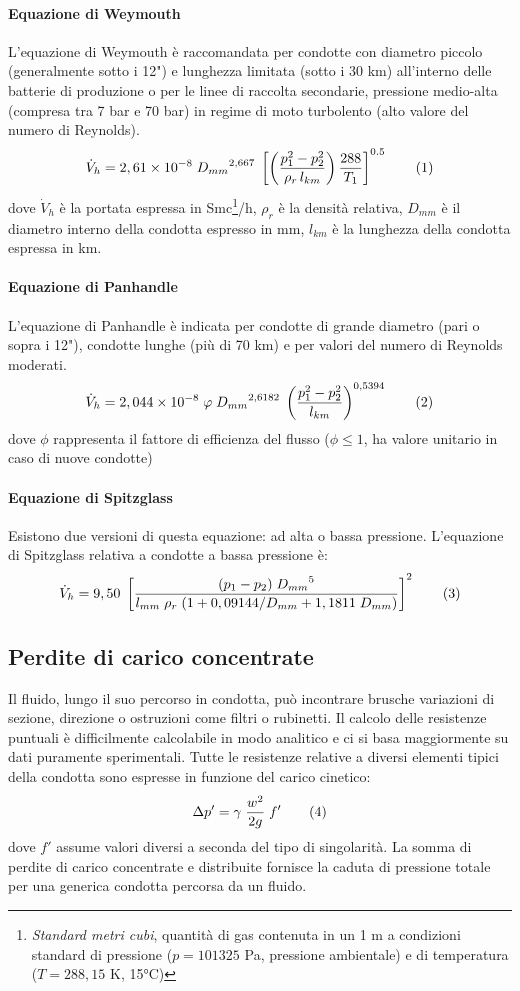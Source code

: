 \paragraph{Equazione di Weymouth}
L'equazione di Weymouth è raccomandata per condotte con diametro piccolo (generalmente sotto i 12") e lunghezza limitata (sotto i 30 km) all'interno delle batterie di produzione o per le linee di raccolta secondarie, pressione medio-alta (compresa tra 7 bar e 70 bar) in regime di moto turbolento (alto valore del numero di Reynolds).
\[\dot{V}_h=2,61\e{-8} \; {D_{mm}}^{2,667} \; \left[ \left(\dfrac{p_1^2 - p_2^2}{\rho_r \, l_{km}}\right) \dfrac{288}{T_1} \right]^{0.5} \addtag \label{eq:weymouth} \]
dove \(\dot{V}_h\) è la portata espressa in Smc\footnote{\textit{Standard metri cubi}, quantità di gas contenuta in un 1 m a condizioni standard di pressione (\(p=101325\) Pa, pressione ambientale) e di temperatura  (\(T=288,15\) K, 15°C)}/h, \(\rho_r\) è la densità relativa, \(D_{mm}\) è il diametro interno della condotta espresso in mm, \(l_{km}\) è la lunghezza della condotta espressa in km.

\paragraph{Equazione di Panhandle}
L'equazione di Panhandle è indicata per condotte di grande diametro (pari o sopra i 12"), condotte lunghe (più di 70 km) e per valori del numero di Reynolds moderati. 
\[\dot{V}_h=2,044\e{-8} \; \phi \;{D_{mm}}^{2,6182} \; \left( \dfrac{p_1^2 - p_2^2}{l_{km}} \right)^{0,5394} \addtag \label{eq:pandhandle} \]
dove \(\phi\) rappresenta il fattore di efficienza del flusso (\(\phi \leq 1\), ha valore unitario in caso di nuove condotte)

\paragraph{Equazione di Spitzglass}
Esistono due versioni di questa equazione: ad alta o bassa pressione. L'equazione di Spitzglass relativa a condotte a bassa pressione è:
\[\dot{V}_h = 9,50 \; \left[ \dfrac{(p_1-p_2) \; {D_{mm}}^5 }{l_{mm} \; \rho_r \; (1+0,09144/D_{mm} + 1,1811 \; D_{mm}) } \right]^2 \addtag \label{eq:spitzglass}\]


\subsection{Perdite di carico concentrate}
Il fluido, lungo il suo percorso in condotta, può incontrare brusche variazioni di sezione, direzione o ostruzioni come filtri o rubinetti. Il calcolo delle resistenze puntuali è difficilmente calcolabile in modo analitico e ci si basa maggiormente su dati puramente sperimentali. Tutte le resistenze relative a diversi elementi tipici della condotta sono espresse in funzione del carico cinetico:
\[\Delta p' = \gamma \; \frac{w^2}{2g} \; f' \addtag \label{eq:concentrate}\]
dove \(f'\) assume valori diversi a seconda del tipo di singolarità. La somma di perdite di carico concentrate e distribuite fornisce la caduta di pressione totale per una generica condotta percorsa da un fluido.

